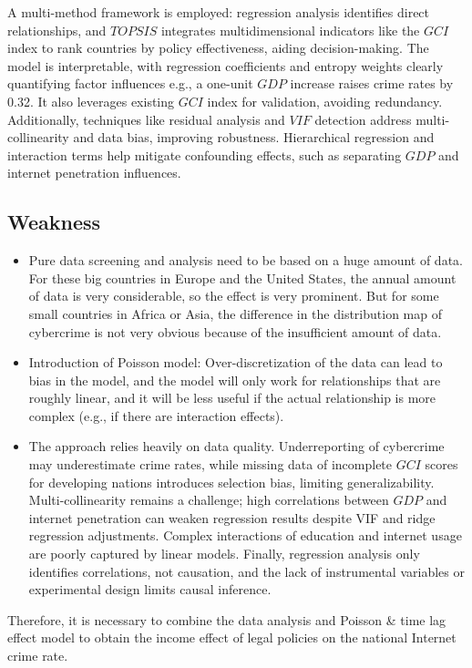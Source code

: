 \begin{itemize}
            A multi-method framework is employed: regression analysis identifies direct relationships, and
            $TOPSIS$ integrates multidimensional indicators like the $GCI$ index to rank countries by policy effectiveness, aiding decision-making.
            The model is interpretable, with regression coefficients and entropy weights clearly quantifying factor influences e.g.,
            a one-unit $GDP$ increase raises crime rates by 0.32.
            It also leverages existing $GCI$ index for validation, avoiding redundancy.
            Additionally, techniques like residual analysis and $VIF$ detection address multi-collinearity and data bias, improving robustness.
            Hierarchical regression and interaction terms help mitigate confounding effects,
            such as separating $GDP$ and internet penetration influences.
    \end{itemize}

\subsection{Weakness}\label{subsec:weakness} %
    \begin{itemize}
        \item Pure data screening and analysis need to be based on a huge amount of data.
            For these big countries in Europe and the United States, the annual amount of data is very considerable,
            so the effect is very prominent.
            But for some small countries in Africa or Asia,
            the difference in the distribution map of cybercrime is not very obvious because of the insufficient amount of data.
        \item Introduction of Poisson model: Over-discretization of the data can lead to bias in the model,
            and the model will only work for relationships that are roughly linear,
            and it will be less useful if the actual relationship is more complex (e.g., if there are interaction effects).
        \item The approach relies heavily on data quality.
            Underreporting of cybercrime may underestimate crime rates,
            while missing data of incomplete $GCI$ scores for developing nations introduces selection bias, limiting generalizability.
            Multi-collinearity remains a challenge; high correlations between $GDP$ and internet penetration can weaken regression results despite VIF and ridge regression adjustments.
            Complex interactions of education and internet usage are poorly captured by linear models.
            Finally, regression analysis only identifies correlations, not causation,
            and the lack of instrumental variables or experimental design limits causal inference.
    \end{itemize}

    Therefore, it is necessary to combine the data analysis and Poisson \& time lag effect model
    to obtain the income effect of legal policies on the national Internet crime rate.


